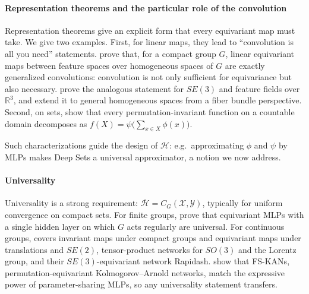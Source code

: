\documentclass[mathematics,review,submit,moreauthors]{Definitions/mdpi}
\begin{document}
\paragraph{Representation theorems and the particular role of the convolution}
Representation theorems give an explicit form that every equivariant map must take.
We give two examples.
First, for linear maps, they lead to ``convolution is all you need'' statements.
\citet{kondor2018p3icml} prove that, for a compact group $G$, linear equivariant maps between feature spaces over homogeneous spaces of $G$ are exactly generalized convolutions: convolution is not only sufficient for equivariance but also necessary.
\citet{weiler2018anips} prove the analogous statement for $SE(3)$ and feature fields over $\mathbb{R}^3$, and \citet{cohen2019anips} extend it to general homogeneous spaces from a fiber bundle perspective.
Second, on sets, \citet{zaheer2018} show that every permutation-invariant function on a countable domain decomposes as $f(X)=\psi\big(\sum_{x\in X}\phi(x)\big)$.

Such characterizations guide the design of $\mathcal{H}$: e.g.\ approximating $\phi$ and $\psi$ by MLPs makes Deep Sets a universal approximator, a notion we now address.

\paragraph{Universality}
Universality is a strong requirement: $\overline{\mathcal{H}} = C_G(\mathcal{X},\mathcal{Y})$, typically for uniform convergence on compact sets.
For finite groups, \citet{ravanbakhsh2020p3icml} prove that equivariant MLPs with a single hidden layer on which $G$ acts regularly are universal.
For continuous groups, \citet{yarotsky2018r} covers invariant maps under compact groups and equivariant maps under translations and $SE(2)$, \citet{bogatskiy2020p3icml} tensor-product networks for $SO(3)$ and the Lorentz group, and \citet{vadgama2025} their $SE(3)$-equivariant network Rapidash.
\citet{elbaz2025} show that FS-KANs, permutation-equivariant Kolmogorov--Arnold networks, match the expressive power of parameter-sharing MLPs, so any universality statement transfers.
\end{document}
